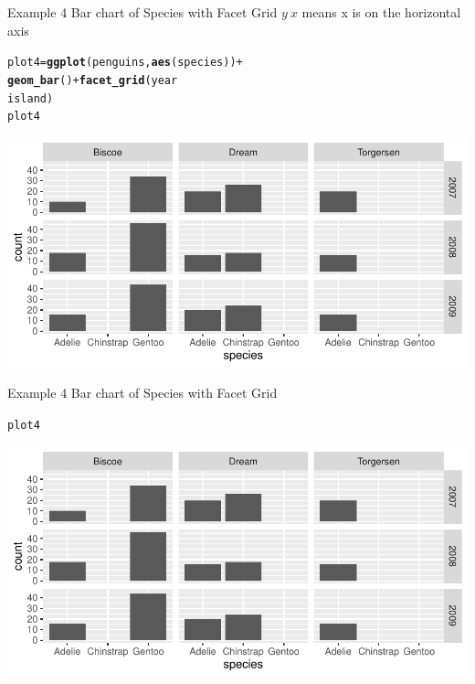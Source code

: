\documentclass{beamer}\usepackage[]{graphicx}\usepackage[]{xcolor}
\makeatletter
\newcommand{\hlopt}[1]{\textcolor[rgb]{0,0,0}{#1}}%
\newcommand{\hlstd}[1]{\textcolor[rgb]{0.345,0.345,0.345}{#1}}%
\newcommand{\hlkwb}[1]{\textcolor[rgb]{0.69,0.353,0.396}{#1}}%
\newcommand{\hlkwd}[1]{\textcolor[rgb]{0.737,0.353,0.396}{\textbf{#1}}}%
\newenvironment{kframe}{%
 \def\at@end@of@kframe{}%
 \ifinner\ifhmode%
  \def\at@end@of@kframe{\end{minipage}}%
  \begin{minipage}{\columnwidth}%
 \fi\fi%
 \def\FrameCommand##1{\hskip\@totalleftmargin \hskip-\fboxsep
 \colorbox{shadecolor}{##1}\hskip-\fboxsep
     \hskip-\linewidth \hskip-\@totalleftmargin \hskip\columnwidth}%
 \MakeFramed {\advance\hsize-\width
   \@totalleftmargin\z@ \linewidth\hsize
   \@setminipage}}%
 {\par\unskip\endMakeFramed%
 \at@end@of@kframe}
\newenvironment{knitrout}{}{} %
\makeatother
\begin{document}
\begin{frame}[fragile]{Example 4 Bar chart of Species with Facet Grid}
$y~x$ means x is on the horizontal axis
\begin{knitrout}
\color{fgcolor}\begin{kframe}
\begin{alltt}
\hlstd{plot4} \hlkwb{=} \hlkwd{ggplot}\hlstd{(penguins,} \hlkwd{aes}\hlstd{(species))} \hlopt{+}
    \hlkwd{geom_bar}\hlstd{()} \hlopt{+} \hlkwd{facet_grid}\hlstd{(year} \hlopt{~}
    \hlstd{island)}
\hlstd{plot4}
\end{alltt}
\end{kframe}
\includegraphics[width=0.95\linewidth]{figure/unnamed-chunk-19-1} 
\end{knitrout}
\end{frame}

\begin{frame}[fragile]{Example 4 Bar chart of Species with Facet Grid}
\begin{knitrout}
\color{fgcolor}\begin{kframe}
\begin{alltt}
\hlstd{plot4}
\end{alltt}
\end{kframe}
\includegraphics[width=0.95\linewidth]{figure/unnamed-chunk-20-1} 
\end{knitrout}
\end{frame}
\end{document}
